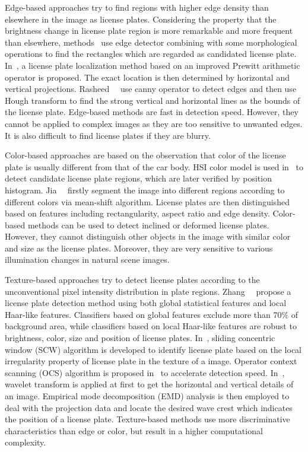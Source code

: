 \documentclass[twocolumn]{svjour3}
\begin{document}
Edge-based approaches try to find regions with higher edge density than elsewhere in the image as license plates. %
Considering the property that the brightness change in license plate region is more remarkable and more frequent than elsewhere, methods~\cite{Bai2004,Qiu2009,Zheng2005,Tan2013,Lalimi2013} use edge detector combining with some morphological operations to find the rectangles which are regarded as candidated license plate. %
In~\cite{Chen2012}, a license plate localization method based on an improved Prewitt arithmetic operator is proposed. The exact location is then determined by horizontal and vertical projections.
Rasheed~\etal~\cite{Rasheed2012} use canny operator to detect edges and then use Hough transform to find the strong vertical and horizontal lines as the bounds of the license plate. %
Edge-based methods are fast in detection speed. However, they cannot be applied to complex images as they are too sensitive to unwanted edges. It is also difficult to find license plates if they are blurry.

Color-based approaches are based on the observation that color of the license plate is usually different from that of the car body. %
HSI color model is used in~\cite{Deb2008} to detect candidate license plate regions, which are later verified by position histogram. Jia~\etal~\cite{Jia2007} firstly segment the image into different regions according to different colors via mean-shift algorithm. License plates are then distinguished based on features including rectangularity, aspect ratio and edge density.  Color-based methods can be used to detect inclined or deformed license plates. However, they cannot distinguish other objects in the image with similar color and size as the license plates. Moreover, they are very sensitive to various illumination changes in natural scene images.


Texture-based approaches try to detect license plates according to the unconventional pixel intensity distribution in plate regions. Zhang~\etal~\cite{Zhang2006} propose a license plate detection method using both global statistical features and local Haar-like features. Classifiers based on global features exclude more than $70\%$ of background area, while classifiers based on local Haar-like features are robust to brightness, color, size and position of license plates.
In~\cite{Giannoukos2006,Giannoukos2010},  sliding concentric window (SCW) algorithm is developed to identify license plate based on the local irregularity property of license plate in the texture of a image. Operator context scanning (OCS) algorithm is proposed in~\cite{Giannoukos2010} to accelerate detection speed. %
In~\cite{Yu2015}, wavelet transform is applied at first to get the horizontal and vertical details of an image. Empirical mode decomposition (EMD) analysis is then employed to deal with the projection data and locate the desired wave crest which indicates the position of a license plate. Texture-based methods use more discriminative characteristics than edge or color, but result in a higher computational complexity.
\end{document}
